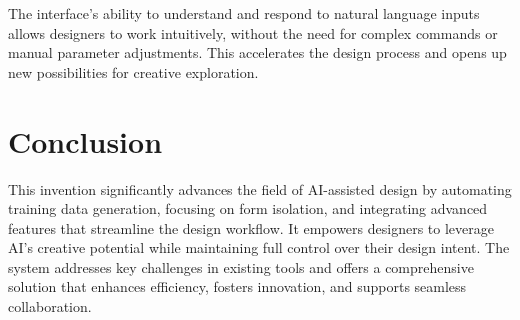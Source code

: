 \documentclass{article}
\begin{document}
The interface's ability to understand and respond to natural language inputs allows designers to work intuitively, without the need for complex commands or manual parameter adjustments. This accelerates the design process and opens up new possibilities for creative exploration.


\section{Conclusion}

This invention significantly advances the field of AI-assisted design by automating training data generation, focusing on form isolation, and integrating advanced features that streamline the design workflow. It empowers designers to leverage AI's creative potential while maintaining full control over their design intent. The system addresses key challenges in existing tools and offers a comprehensive solution that enhances efficiency, fosters innovation, and supports seamless collaboration.
\end{document}
